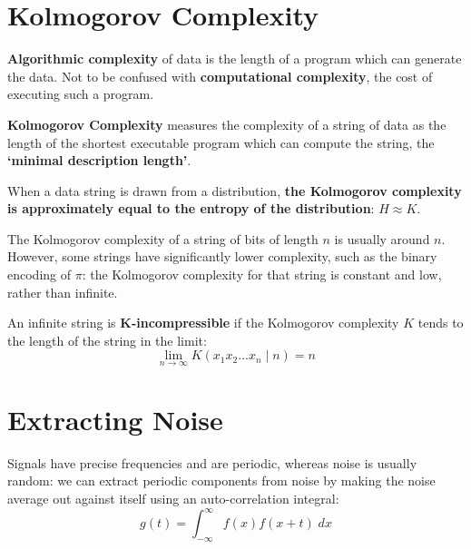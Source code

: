 \documentclass[a4paper, 11pt]{article}
\begin{document}
\section*{Kolmogorov Complexity}
{
    \textbf{Algorithmic complexity} of data is the length of a program which can generate the data. Not to be confused with \textbf{computational complexity}, the cost of executing such a program.

    \textbf{Kolmogorov Complexity} measures the complexity of a string of data as the length of the shortest executable program which can compute the string, the \textbf{`minimal description length'}.

    When a data string is drawn from a distribution, \textbf{the Kolmogorov complexity is approximately equal to the entropy of the distribution}: \(H \approx K\).

    The Kolmogorov complexity of a string of bits of length \(n\) is usually around \(n\). However, some strings have significantly lower complexity, such as the binary encoding of \(\pi\): the Kolmogorov complexity for that string is constant and low, rather than infinite.

    An infinite string is \textbf{K-incompressible} if the Kolmogorov complexity \(K\) tends to the length of the string in the limit:
    \[\lim_{n\rightarrow\infty}{K(x_1x_2...x_n \mid n)} = n\]
}
\section*{Extracting Noise}
{
    Signals have precise frequencies and are periodic, whereas noise is usually random: we can extract periodic components from noise by making the noise average out against itself using an auto-correlation integral:
    \[g(t) = \int_{-\infty}^\infty{f(x)f(x + t)\;dx}\]
}
\end{document}
